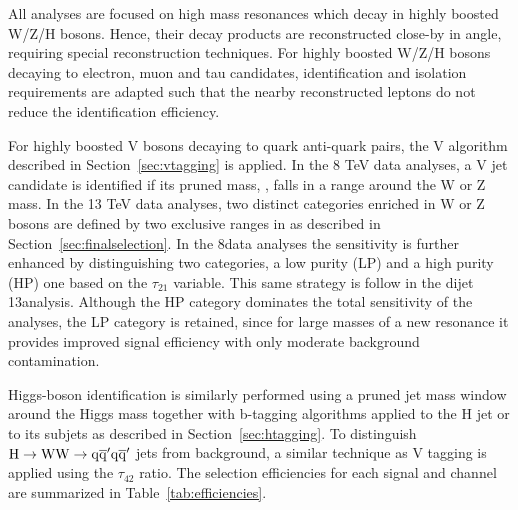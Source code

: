 All analyses are focused on high mass resonances which decay in highly boosted W/Z/H bosons. Hence, their decay products are reconstructed close-by in angle, requiring special reconstruction techniques.
For highly boosted W/Z/H bosons decaying to electron, muon and tau candidates, identification and isolation requirements are adapted such that the nearby reconstructed leptons do not reduce the identification efficiency.

For highly boosted V bosons decaying to quark anti-quark pairs, the V algorithm described in Section~\ref{sec:vtagging} is applied.
In the 8 TeV data analyses, a V jet candidate is identified if its pruned mass, \mJ, falls in a range around the W or Z mass.
In the 13 TeV data analyses, two distinct categories enriched in W or Z bosons are defined by two exclusive ranges in \mJ as described in Section~\ref{sec:finalselection}.
In the 8\TeV data analyses the sensitivity is further enhanced by distinguishing two categories, a low purity (LP) and a high purity (HP) one based on the $\tau_{21}$ variable.
This same strategy is follow in the dijet 13\TeV analysis. Although the HP category dominates the total sensitivity of the analyses, the LP category is retained,
since for large masses of a new resonance it provides improved signal efficiency with only moderate background contamination.

Higgs-boson identification is similarly performed using a pruned jet mass window around the Higgs mass together with b-tagging algorithms applied to the H jet or to its subjets as described in Section~\ref{sec:htagging}.
To distinguish $\rm H\to \rm W\rm W\to \mathrm{q}\overline{\mathrm{q}}'\mathrm{q}\overline{\mathrm{q}}'$ jets from background, a similar technique as V tagging is applied using the $\tau_{42}$ ratio. The selection efficiencies for each signal and channel are summarized in Table~\ref{tab:efficiencies}.

